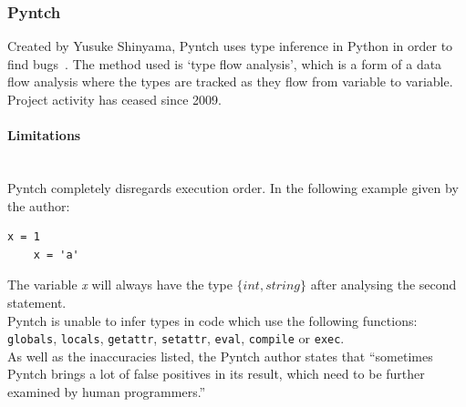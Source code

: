 \documentclass[12pt, titlepage]{article}
\begin{document}
\subsubsection{Pyntch}
Created by Yusuke Shinyama, Pyntch uses type inference in Python in order to find bugs~\cite{pyntch}. The method used is `type flow analysis', which is a form of a data flow analysis where the types are tracked as they flow from variable to variable. \\
\indent Project activity has ceased since 2009.
\paragraph{Limitations}\mbox{}\\
Pyntch completely disregards execution order. In the following example given by the author:
\begin{lstlisting}[mathescape]
	x = 1
	x = 'a'
\end{lstlisting}
The variable \textit{x} will always have the type $\{int, string\}$ after analysing the second statement. \\
\indent Pyntch is unable to infer types in code which use the following functions: \texttt{globals},  \texttt{locals},  \texttt{getattr},  \texttt{setattr},  \texttt{eval},  \texttt{compile} or  \texttt{exec}. \\
\indent As well as the inaccuracies listed, the Pyntch author states that ``sometimes Pyntch brings a lot of false positives in its result, which need to be further examined by human programmers.''

\end{document}
